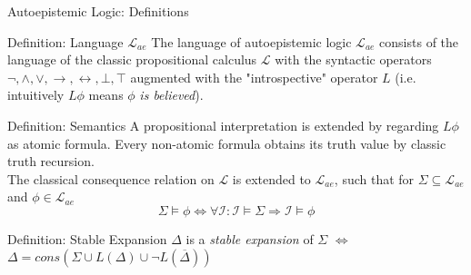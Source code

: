 \documentclass[usenames,dvipsnames, 8pt]{beamer}
\let\liff\leftrightarrow
\let\lif\to
\let\lneg\neg
\let\lbot\bot
\let\ltop\top
\begin{document}
\begin{frame}{Autoepistemic Logic: Definitions}
\begin{block}{Definition: Language $\mathcal{L}_{ae}$}
The language of autoepistemic logic $\mathcal{L}_{ae}$ consists of the language of the classic propositional calculus $\mathcal{L}$ with the syntactic operators $\lneg, \land ,\lor, \lif, \liff, \lbot, \ltop$ augmented with the "introspective" operator $L$ (i.e. intuitively $L\phi$ means $\phi$ \emph{is believed}).
\end{block}

\begin{block}{Definition: Semantics}
A propositional interpretation is extended by regarding $L\phi$ as atomic formula. Every non-atomic formula obtains its truth value by classic truth recursion. \\

The classical consequence relation on $\mathcal{L}$ is extended to $\mathcal{L}_{ae}$, such that for $\Sigma \subseteq \mathcal{L}_{ae}$ and $\phi  \in \mathcal{L}_{ae} $
\begin{equation*}
\Sigma \models \phi \iff \forall \mathcal{I} : \mathcal{I} \models \Sigma \Rightarrow \mathcal{I} \models \phi
\end{equation*}
\end{block}

\begin{block}{Definition: Stable Expansion}
$\Delta$ is a \emph{stable expansion} of  $\Sigma$  $\iff$ $\Delta = cons(\Sigma \cup L(\Delta) \cup \neg L(\overline{\Delta}))$
\end{block}

\end{frame}
\end{document}
